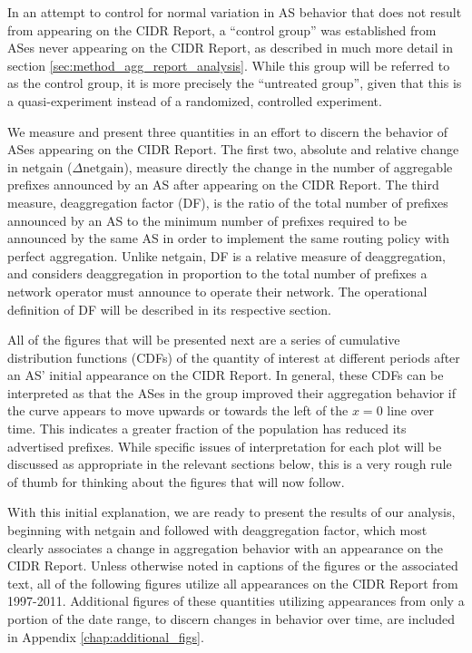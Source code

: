 In an attempt to control for normal variation in AS behavior that does not
result from appearing on the CIDR Report, a ``control group'' was established
from ASes never appearing on the CIDR Report, as described in much more detail
in section \ref{sec:method_agg_report_analysis}. While this group will be
referred to as the control group, it is more precisely the ``untreated group'',
given that this is a quasi-experiment instead of a randomized, controlled
experiment.

We measure and present three quantities in an effort to discern the behavior of
ASes appearing on the CIDR Report. The first two, absolute and relative change
in netgain ($\Delta\textrm{netgain}$), measure directly the change in the
number of aggregable prefixes announced by an AS after appearing on the CIDR
Report. The third measure, deaggregation factor (DF), is the ratio of the total
number of prefixes announced by an AS to the minimum number of prefixes
required to be announced by the same AS in order to implement the same routing
policy with perfect aggregation. Unlike netgain, DF is a relative measure of
deaggregation, and considers deaggregation in proportion to the total number of
prefixes a network operator must announce to operate their network. The
operational definition of DF will be described in its respective section.

All of the figures that will be presented next are a series of cumulative
distribution functions (CDFs) of the quantity of interest at different periods
after an AS' initial appearance on the CIDR Report. In general, these CDFs can
be interpreted as that the ASes in the group improved their aggregation
behavior if the curve appears to move upwards or towards the left of the $x=0$
line over time. This indicates a greater fraction of the population has reduced
its advertised prefixes. While specific issues of interpretation for each plot
will be discussed as appropriate in the relevant sections below, this is a very
rough rule of thumb for thinking about the figures that will now follow.

With this initial explanation, we are ready to present the results of our
analysis, beginning with netgain and followed with deaggregation factor, which
most clearly associates a change in aggregation behavior with an appearance on
the CIDR Report. Unless otherwise noted in captions of the figures or the
associated text, all of the following figures utilize all appearances on the
CIDR Report from 1997-2011. Additional figures of these quantities utilizing
appearances from only a portion of the date range, to discern changes in
behavior over time, are included in Appendix \ref{chap:additional_figs}.

